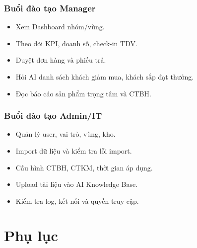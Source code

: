 \documentclass[12pt,a4paper,oneside,openany]{book}
\newcommand{\checkbox}{\makebox[1.2em][l]{$\square$}}
\begin{document}
\section{Buổi đào tạo Manager}
\begin{itemize}
  \item \checkbox Xem Dashboard nhóm/vùng.
  \item \checkbox Theo dõi KPI, doanh số, check-in TDV.
  \item \checkbox Duyệt đơn hàng và phiếu trả.
  \item \checkbox Hỏi AI danh sách khách giảm mua, khách sắp đạt thưởng.
  \item \checkbox Đọc báo cáo sản phẩm trọng tâm và CTBH.
\end{itemize}

\section{Buổi đào tạo Admin/IT}
\begin{itemize}
  \item \checkbox Quản lý user, vai trò, vùng, kho.
  \item \checkbox Import dữ liệu và kiểm tra lỗi import.
  \item \checkbox Cấu hình CTBH, CTKM, thời gian áp dụng.
  \item \checkbox Upload tài liệu vào AI Knowledge Base.
  \item \checkbox Kiểm tra log, kết nối và quyền truy cập.
\end{itemize}

\appendix
\part{Phụ lục}
\end{document}
